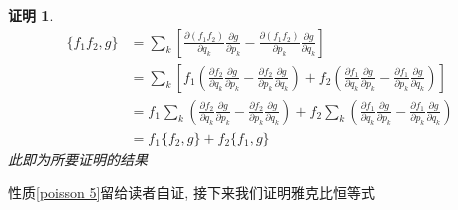 \documentclass[a4paper,11pt]{article}
\theoremstyle{mystyle}
\newtheorem{Proof}{\hspace{2em}证明}[section]
\begin{document}
\begin{Proof}
  \begin{equation*}
    \begin{split}
       \{f_1f_2,g\}&=\sum_{k}\left[\frac{\partial{(f_1f_2)}}{\partial{q_k}}\frac{\partial g}{\partial{p_k}}-\frac{\partial{(f_1f_2)}}{\partial{p_k}}\frac{\partial g}{\partial{q_k}}\right]\\
         &=\sum_{k}\left[f_1\left(\frac{\partial{f_2}}{\partial{q_k}}\frac{\partial g}{\partial{p_k}}-\frac{\partial{f_2}}{\partial{p_k}}\frac{\partial g}{\partial{q_k}}\right)+f_2\left(\frac{\partial{f_1}}{\partial{q_k}}\frac{\partial g}{\partial{p_k}}-\frac{\partial{f_1}}{\partial{p_k}}\frac{\partial g}{\partial{q_k}}\right)\right]\\
         &=f_1\sum_{k}\left(\frac{\partial{f_2}}{\partial{q_k}}\frac{\partial g}{\partial{p_k}}-\frac{\partial{f_2}}{\partial{p_k}}\frac{\partial g}{\partial{q_k}}\right)+f_2\sum_{k}\left(\frac{\partial{f_1}}{\partial{q_k}}\frac{\partial g}{\partial{p_k}}-\frac{\partial{f_1}}{\partial{p_k}}\frac{\partial g}{\partial{q_k}}\right) \\
         &=f_1\{f_2,g\}+f_2\{f_1,g\}
    \end{split}
  \end{equation*}
  此即为所要证明的结果
\end{Proof}
性质\ref{poisson 5}留给读者自证, 接下来我们证明雅克比恒等式
\end{document}
